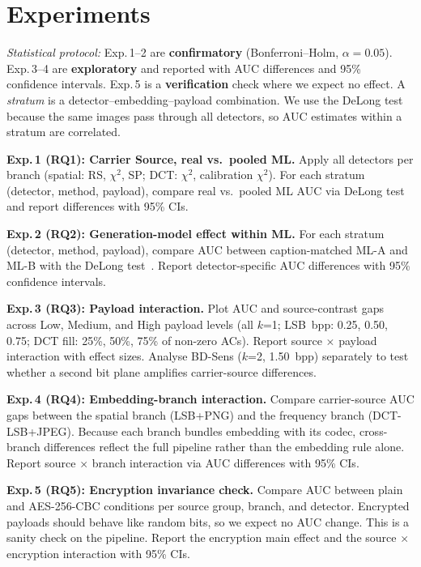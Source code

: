 \documentclass[10pt,twocolumn,a4paper]{article}
\begin{document}
\section{Experiments}
\label{sec:experiments}

\noindent\textit{Statistical protocol:} Exp.\,1--2 are \textbf{confirmatory} (Bonferroni--Holm, $\alpha = 0.05$). Exp.\,3--4 are \textbf{exploratory} and reported with AUC differences and 95\% confidence intervals. Exp.\,5 is a \textbf{verification} check where we expect no effect. A \emph{stratum} is a detector--embedding--payload combination. We use the DeLong test~\cite{delong1988} because the same images pass through all detectors, so AUC estimates within a stratum are correlated.

\textbf{Exp.\,1 (RQ1): Carrier Source, real vs.\ pooled ML.} Apply all detectors per branch (spatial: RS, $\chi^2$, SP; DCT: $\chi^2$, calibration $\chi^2$). For each stratum (detector, method, payload), compare real vs.\ pooled ML AUC via DeLong test and report differences with 95\% CIs.

\textbf{Exp.\,2 (RQ2): Generation-model effect within ML.} For each stratum (detector, method, payload), compare AUC between caption-matched ML-A and ML-B with the DeLong test~\cite{delong1988}. Report detector-specific AUC differences with 95\% confidence intervals.

\textbf{Exp.\,3 (RQ3): Payload interaction.} Plot AUC and source-contrast gaps across Low, Medium, and High payload levels (all $k$=1; LSB~bpp: 0.25, 0.50, 0.75; DCT fill: 25\%, 50\%, 75\% of non-zero ACs). Report source $\times$ payload interaction with effect sizes. Analyse BD-Sens ($k$=2, 1.50~bpp) separately to test whether a second bit plane amplifies carrier-source differences.

\textbf{Exp.\,4 (RQ4): Embedding-branch interaction.} Compare carrier-source AUC gaps between the spatial branch (LSB+PNG) and the frequency branch (DCT-LSB+JPEG). Because each branch bundles embedding with its codec, cross-branch differences reflect the full pipeline rather than the embedding rule alone. Report source $\times$ branch interaction via AUC differences with 95\% CIs.

\textbf{Exp.\,5 (RQ5): Encryption invariance check.} Compare AUC between plain and AES-256-CBC conditions per source group, branch, and detector. Encrypted payloads should behave like random bits, so we expect no AUC change. This is a sanity check on the pipeline. Report the encryption main effect and the source $\times$ encryption interaction with 95\% CIs.
\end{document}
